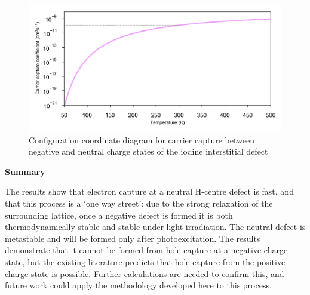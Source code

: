 {\begin{figure}[h!]   
\centering
  \includegraphics[width=1.0\columnwidth]{figures/ch6/carrier_capture_rate.png}
  \caption[Rate of electron capture at the ]{Configuration coordinate diagram for carrier capture between negative and neutral charge states of the iodine interstitial defect}
\label{carrier_capture_rate}
\end{figure}




\textbf{Summary}

The results show that electron capture at a neutral H-centre defect is fast, and that this process is a `one way street': due to the strong relaxation of the surrounding lattice, once a negative defect is formed it is both thermodynamically stable and stable under light irradiation.
The neutral defect is metastable and will be formed only after photoexcitation. The results demonstrate that it cannot be formed from hole capture at a negative charge state, but the existing literature predicts that hole capture from the positive charge state is possible. Further calculations are needed to confirm this, and future work could apply the methodology developed here to this process. 





 

}
